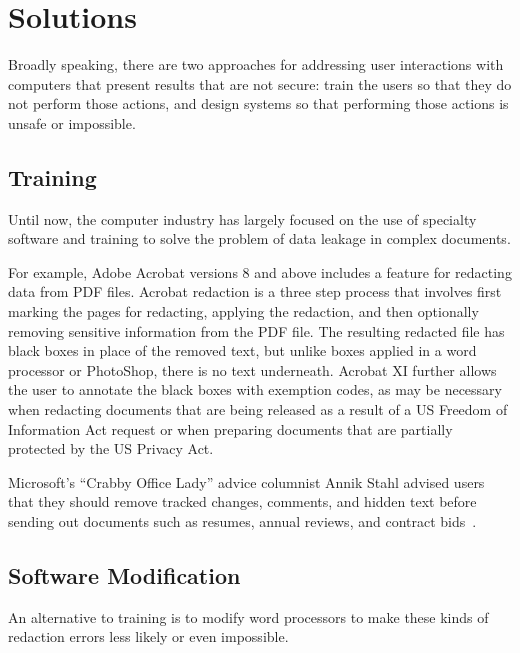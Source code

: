 \section{Solutions}
Broadly speaking, there are two approaches for addressing user
interactions with computers that present results that are not secure:
train the users so that they do not perform those actions, and design
systems so that performing those actions is unsafe or
impossible. 


\subsection{Training}

Until now, the computer industry has largely focused on
the use of specialty software and training to solve the problem of
data leakage in complex documents. 

For example, Adobe Acrobat versions 8 and above includes a feature for
redacting data from PDF files. Acrobat redaction is a three step process
that involves first marking the pages for redacting, applying the
redaction, and then optionally removing sensitive information from the
PDF file. The resulting redacted file has black boxes in place of the
removed text, but unlike boxes applied in a word processor or
PhotoShop, there is no text underneath.  Acrobat XI further allows
the user to annotate the black boxes with exemption codes, as may be
necessary when redacting documents that are being released as a result
of a US Freedom of Information Act request or when preparing documents
that are partially protected by the US Privacy Act. 


Microsoft's ``Crabby Office Lady'' advice columnist Annik Stahl
advised users that they should remove
tracked changes, comments, and hidden text before sending out
documents such as resumes, annual reviews, and contract bids~\cite{microsoft-track-changes}.


\subsection{Software Modification}

An alternative to training is to modify
word processors to make these kinds of redaction errors less likely or even impossible.

